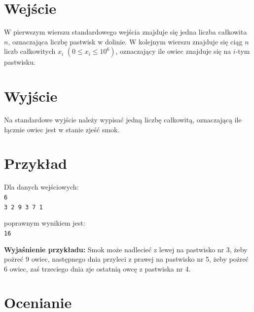 \documentclass[10pt]{article}
\begin{document}

    \section*{Wejście}
    
    W pierwszym wierszu standardowego wejścia znajduje się jedna liczba całkowita $n$, oznaczająca liczbę pastwisk w dolinie. W kolejnym wierszu znajduje się ciąg $n$ liczb całkowitych $x_{i}$ $(0\leq x_{i} \leq 10^{6})$, oznaczający ile owiec znajduje się na $i$-tym pastwisku.


    \section*{Wyjście}
    
    Na standardowe wyjście należy wypisać jedną liczbę całkowitą, oznaczającą ile łącznie owiec jest w stanie zjeść smok.


    \section*{Przykład}
    
    \noindent
    \begin{minipage}[t]{0.5\textwidth}
        Dla danych wejściowych:\vspace{1ex}\\
        \texttt{6\\3 2 9 3 7 1}
    \end{minipage}
    \begin{minipage}[t]{0.5\textwidth}
        poprawnym wynikiem jest:\vspace{1ex}\\
        \texttt{16}
    \end{minipage}
    
    \vspace{2ex}
    \noindent\textbf{Wyjaśnienie przykładu:} Smok może nadlecieć z lewej na pastwisko nr 3, żeby pożreć 9 owiec, następnego dnia przyleci z prawej na pastwisko nr 5, żeby pożreć 6 owiec, zaś trzeciego dnia zje ostatnią owcę z pastwiska nr 4.
    

    \section*{Ocenianie}
        
\end{document}

